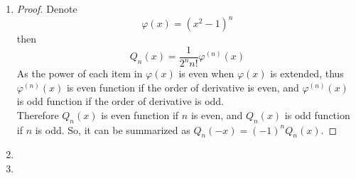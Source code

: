 \documentclass[paper=a4, fontsize=11pt]{scrartcl} %
\numberwithin{equation}{section} %
\numberwithin{figure}{section} %
\numberwithin{table}{section} %
\begin{document}
\begin{enumerate}
\begin{proof}
\begin{enumerate}
					\item
						If $g(x) = Q_n(x)$, then the $n-th$ derivative of $g(x)$ is
						\begin{equation}
							g^{(n)}(x) = Q^{(n)}(x) = \frac{(2n)!}{2^n n!}
						\end{equation} 
						Thus
						\begin{equation}
							\begin{aligned}
								\int_{-1}^{1}Q_n(x)Q_m(x)dx	
								& = \int_{-1}^{1}Q_n^2(x)dx \\
								& = \frac{(-1)^n (2n)!}{2^{2n}(n!)^2}\int_{-1}^{1}(x^2-1)^n dx\\
								& = \frac{(2n)!}{2^{2n}(n!)^2}\int_{-1}^{1}(1-x^2)^n dx\\
								& = \frac{(2n)!}{2^{2n}(n!)^2} \int_{0}^{\pi/2} cos^{2n+1}t dt\\
								& = \frac{(2n)!}{2^{2n}(n!)^2} \frac{2 \times 4 \times ... \times (2n)}{1\times3\times ... \times (2n+1)}\\
								& = \frac{2}{2n+1} \ \ (\text{$n = m$})
							\end{aligned}
						\end{equation}
				\end{enumerate}
				
				Thus, $(Q_n)_{n\in\mathbb{N}}$ are a sequence of orthogonal polynomials.
			\end{proof}
		
		\item
			\begin{proof}
				Denote
				\begin{equation}
				\varphi(x) = (x^2-1)^n
				\end{equation}
				then
				\begin{equation}
				Q_n(x) = \frac{1}{2^n n!}\varphi^{(n)}(x)
				\end{equation}
				As the power of each item in $\varphi(x)$ is even when $\varphi(x)$ is extended, thus $\varphi^{(n)}(x)$ is even function if the order of derivative is even, and $\varphi^{(n)}(x)$ is odd function if the order of derivative is odd. \\
				Therefore $Q_n(x)$ is even function if $n$ is even, and $Q_n(x)$ is odd function if $n$ is odd. So, it can be summarized as $Q_n(-x) = (-1)^n Q_n(x)$. 
			\end{proof}
		
		\item
			
		\item
	
	\end{enumerate}
\end{document}
